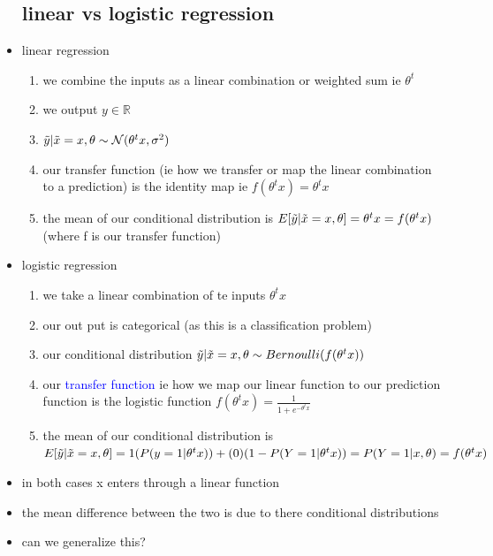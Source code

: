 \documentclass{article}
\begin{document}
\begin{itemize}
\subsection*{linear vs logistic regression}
\item linear regression
\begin{enumerate}
    \item we combine the inputs as a linear combination or weighted sum ie $\theta^{t}$
    \item we output $y\in \mathbb{R}$
    \item $\Tilde{y}|\tilde{x}=x, \theta\sim \mathcal{N}(\theta^{t}x, \sigma^{2})$
    \item our transfer function  (ie how we transfer or map the linear combination to a prediction) is the identity map ie $f(\theta^{t}x)=\theta^{t}x$ 
    \item the mean of our conditional distribution is $E[\Tilde{y}|\Tilde{x}=x, \theta]=\theta^{t}x=f(\theta^{t}x)$ (where f is our transfer function)
\end{enumerate}
\item logistic regression
\begin{enumerate}
    \item we take a linear combination of te inputs $\theta^{t}x$
    \item our out put is categorical (as this is a classification problem)
    \item our conditional distribution $\Tilde{y}|\Tilde{x}=x, \theta \sim Bernoulli(f(\theta^{t}x))$
    \item our \textcolor{blue}{transfer function} ie how we map our linear function to our prediction function is the logistic function $f(\theta^{t}x)=\frac{1}{1+e^{-\theta^{t}x}}$
    \item the mean of our conditional distribution is $E[\Tilde{y}|\Tilde{x}=x,\theta]=1(P(y=1|\theta^{t}x))+(0)(1-P(Y=1|\theta^{t}x))=P(Y=1|x,\theta)=f(\theta^{t}x)$ 
\end{enumerate}
\item in both cases x enters through a linear function 
\item the mean difference between the two is due to there conditional distributions
\item can we generalize this?

\end{itemize}
\end{document}
